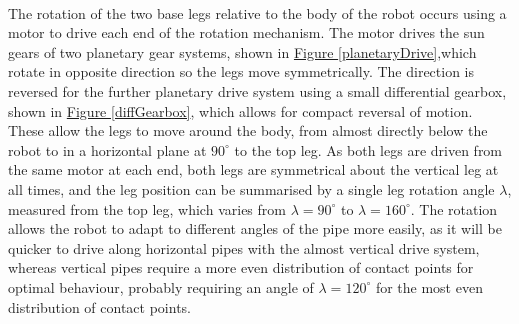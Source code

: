 \documentclass[11pt]{article}		%
\newcommand{\figref}[1]{\hyperref[#1]{Figure \ref*{#1}}}    %
\begin{document}
			\\
			The rotation of the two base legs relative to the body of the robot occurs using a motor to drive each end of the rotation mechanism.
			The motor drives the sun gears of two planetary gear systems, shown in \figref{planetaryDrive},which rotate in opposite direction so the legs move symmetrically.
			The direction is reversed for the further planetary drive system using a small differential gearbox, shown in \figref{diffGearbox}, which allows for compact reversal of motion.
			These allow the legs to move around the body, from almost directly below the robot to in a horizontal plane at $90^\circ$ to the top leg.
			As both legs are driven from the same motor at each end, both legs are symmetrical about the vertical leg at all times, and the leg position can be summarised by a single leg rotation angle $\lambda$, measured from the top leg, which varies from $\lambda = 90^\circ$ to $\lambda = 160^\circ$.
			The rotation allows the robot to adapt to different angles of the pipe more easily, as it will be quicker to drive along horizontal pipes with the almost vertical drive system, whereas vertical pipes require a more even distribution of contact points for optimal behaviour, probably requiring an angle of $\lambda = 120^\circ$ for the most even distribution of contact points.
									
\end{document}
